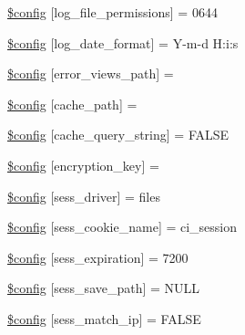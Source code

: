 \begin{DoxyCompactItemize}
\item 
\mbox{\hyperlink{application_2config_2config_8php_a2f0158b0ecb2c39e093957526953346a}{\$config}} \mbox{[}\textquotesingle{}log\+\_\+file\+\_\+permissions\textquotesingle{}\mbox{]} = 0644
\item 
\mbox{\hyperlink{application_2config_2config_8php_ae9f524e834e4d05f0e30aed5edb33e2c}{\$config}} \mbox{[}\textquotesingle{}log\+\_\+date\+\_\+format\textquotesingle{}\mbox{]} = \textquotesingle{}Y-\/m-\/d H\+:i\+:s\textquotesingle{}
\item 
\mbox{\hyperlink{application_2config_2config_8php_a7c49f60eb08b8ebddb5e5af1d02b2b72}{\$config}} \mbox{[}\textquotesingle{}error\+\_\+views\+\_\+path\textquotesingle{}\mbox{]} = \textquotesingle{}\textquotesingle{}
\item 
\mbox{\hyperlink{application_2config_2config_8php_a0f1391e01a3a0b76f22e6c0b5c0f47af}{\$config}} \mbox{[}\textquotesingle{}cache\+\_\+path\textquotesingle{}\mbox{]} = \textquotesingle{}\textquotesingle{}
\item 
\mbox{\hyperlink{application_2config_2config_8php_a70f4af0a439597d3d7f8be31a050867e}{\$config}} \mbox{[}\textquotesingle{}cache\+\_\+query\+\_\+string\textquotesingle{}\mbox{]} = F\+A\+L\+SE
\item 
\mbox{\hyperlink{application_2config_2config_8php_af43facf6a8ff007843b771513aa93dfe}{\$config}} \mbox{[}\textquotesingle{}encryption\+\_\+key\textquotesingle{}\mbox{]} = \textquotesingle{}\textquotesingle{}
\item 
\mbox{\hyperlink{application_2config_2config_8php_aaeca65cee3c00f9df76c74e352283c3c}{\$config}} \mbox{[}\textquotesingle{}sess\+\_\+driver\textquotesingle{}\mbox{]} = \textquotesingle{}files\textquotesingle{}
\item 
\mbox{\hyperlink{application_2config_2config_8php_a416e16954fea70dd96e9ff2134451b87}{\$config}} \mbox{[}\textquotesingle{}sess\+\_\+cookie\+\_\+name\textquotesingle{}\mbox{]} = \textquotesingle{}ci\+\_\+session\textquotesingle{}
\item 
\mbox{\hyperlink{application_2config_2config_8php_a233a1bb9ff2f169ef3cfa142121a25f7}{\$config}} \mbox{[}\textquotesingle{}sess\+\_\+expiration\textquotesingle{}\mbox{]} = 7200
\item 
\mbox{\hyperlink{application_2config_2config_8php_a3d653cf8ae8e24c6a336796f7447ccad}{\$config}} \mbox{[}\textquotesingle{}sess\+\_\+save\+\_\+path\textquotesingle{}\mbox{]} = N\+U\+LL
\item 
\mbox{\hyperlink{application_2config_2config_8php_ad61d051008d3524d24ba135bfeb1531f}{\$config}} \mbox{[}\textquotesingle{}sess\+\_\+match\+\_\+ip\textquotesingle{}\mbox{]} = F\+A\+L\+SE

\end{DoxyCompactItemize}
